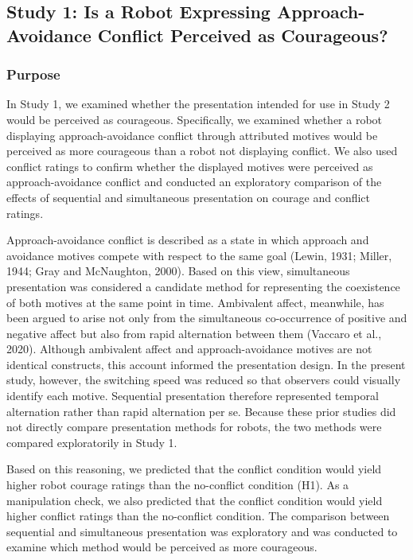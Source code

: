 \subsection{Study 1: Is a Robot Expressing Approach-Avoidance Conflict
Perceived as
Courageous?}\label{study-1-is-a-robot-expressing-approach-avoidance-conflict-perceived-as-courageous}

\subsubsection{Purpose}\label{purpose}

In Study 1, we examined whether the presentation intended for use in
Study 2 would be perceived as courageous. Specifically, we examined
whether a robot displaying approach-avoidance conflict through
attributed motives would be perceived as more courageous than a robot
not displaying conflict. We also used conflict ratings to confirm
whether the displayed motives were perceived as approach-avoidance
conflict and conducted an exploratory comparison of the effects of
sequential and simultaneous presentation on courage and conflict
ratings.

Approach-avoidance conflict is described as a state in which approach
and avoidance motives compete with respect to the same goal (Lewin,
1931; Miller, 1944; Gray and McNaughton, 2000). Based on this view,
simultaneous presentation was considered a candidate method for
representing the coexistence of both motives at the same point in time.
Ambivalent affect, meanwhile, has been argued to arise not only from the
simultaneous co-occurrence of positive and negative affect but also from
rapid alternation between them (Vaccaro et al., 2020). Although
ambivalent affect and approach-avoidance motives are not identical
constructs, this account informed the presentation design. In the
present study, however, the switching speed was reduced so that
observers could visually identify each motive. Sequential presentation
therefore represented temporal alternation rather than rapid alternation
per se. Because these prior studies did not directly compare
presentation methods for robots, the two methods were compared
exploratorily in Study 1.

Based on this reasoning, we predicted that the conflict condition would
yield higher robot courage ratings than the no-conflict condition (H1).
As a manipulation check, we also predicted that the conflict condition
would yield higher conflict ratings than the no-conflict condition. The
comparison between sequential and simultaneous presentation was
exploratory and was conducted to examine which method would be perceived
as more courageous.

